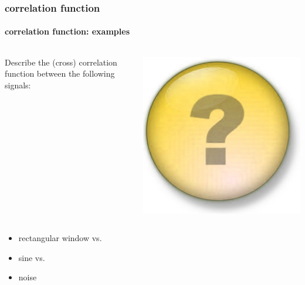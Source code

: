 \begin{frame}\frametitle{correlation function}\framesubtitle{correlation function: examples}
	{
		\vspace{-15mm}
		\begin{columns}
			\column{5cm}
			Describe the (cross) correlation function between the following signals:
			
			\column{4cm}
			\begin{flushright}
				 \includegraphics[scale=.08]{Graph/question-mark}
			\end{flushright}
		\end{columns}
	
		\begin{itemize}
			\item	rectangular window vs.
			\item	sine vs.
			\item	noise
		\end{itemize}
	}


\end{frame}
